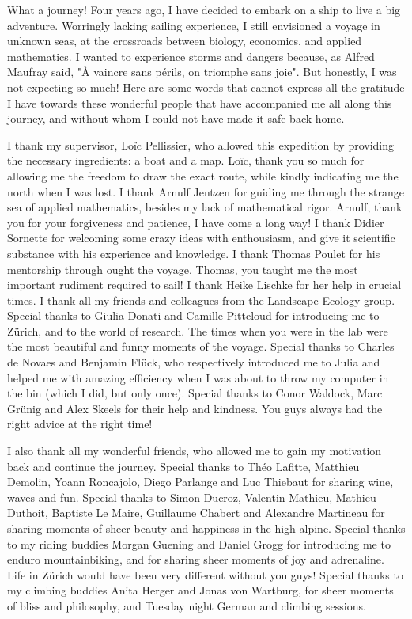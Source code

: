 %
\label{sec:acknowledgement}


What a journey!
% 
Four years ago, I have decided to embark on a ship to live a big adventure.
% 
Worringly lacking sailing experience, I still envisioned a voyage in unknown seas, at the crossroads between biology, economics, and applied mathematics.
% 
I wanted to experience storms and dangers because, as Alfred Maufray said, "À vaincre sans périls, on triomphe sans joie".
% 
But honestly, I was not expecting so much!
% 
Here are some words that cannot express all the gratitude I have towards these wonderful people that have accompanied me all along this journey, and without whom I could not have made it safe back home.

I thank my supervisor, Loïc Pellissier, who allowed this expedition by providing the necessary ingredients: a boat and a map. Loïc, thank you so much for allowing me the freedom to draw the exact route, while kindly indicating me the north when I was lost.
% 
I thank Arnulf Jentzen for guiding me through the strange sea of applied mathematics, besides my lack of mathematical rigor. Arnulf, thank you for your forgiveness and patience, I have come a long way!
% 
I thank Didier Sornette for welcoming some crazy ideas with enthousiasm, and give it scientific substance with his experience and knowledge.
% 
I thank Thomas Poulet for his mentorship through ought the voyage. Thomas, you taught me the most important rudiment required to sail! 
% 
I thank Heike Lischke for her help in crucial times.
% 
I thank all my friends and colleagues from the Landscape Ecology group. Special thanks to Giulia Donati and Camille Pitteloud for introducing me to Zürich, and to the world of research. The times when you were in the lab were the most beautiful and funny moments of the voyage.
% 
Special thanks to Charles de Novaes and Benjamin Flück, who respectively introduced me to Julia and helped me with amazing efficiency when I was about to throw my computer in the bin (which I did, but only once).
% 
Special thanks to Conor Waldock, Marc Grünig and Alex Skeels for their help and kindness. You guys always had the right advice at the right time!

I also thank all my wonderful friends, who allowed me to gain my motivation back and continue the journey.
% 
Special thanks to Théo Lafitte, Matthieu Demolin, Yoann Roncajolo, Diego Parlange and Luc Thiebaut for sharing wine, waves and fun.
% 
Special thanks to Simon Ducroz, Valentin Mathieu, Mathieu Duthoit, Baptiste Le Maire, Guillaume Chabert and Alexandre Martineau for sharing moments of sheer beauty and happiness in the high alpine.
% 
Special thanks to my riding buddies Morgan Guening and Daniel Grogg for introducing me to enduro mountainbiking, and for sharing sheer moments of joy and adrenaline. Life in Zürich would have been very different without you guys! 
% 
Special thanks to my climbing buddies Anita Herger and Jonas von Wartburg, for sheer moments of bliss and philosophy, and Tuesday night German and climbing sessions.

